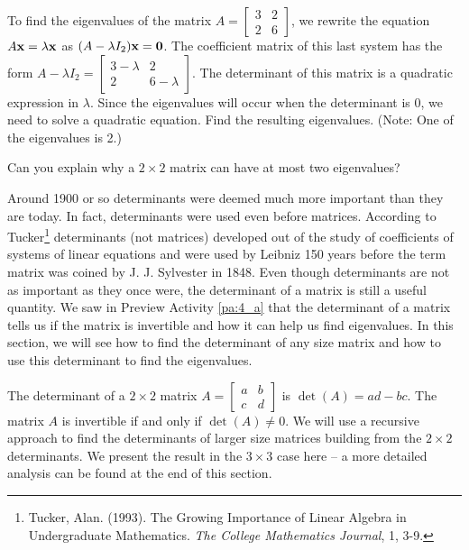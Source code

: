\begin{pa}
\item To find the eigenvalues of the matrix $A=\left[ \begin{array}{cc} 3&2\\2&6 \end{array} \right]$, we rewrite the equation $A \mathbf{x} = \lambda \mathbf{x}$ as $(A - \lambda I_2) \mathbf{x} = \mathbf{0}$. The coefficient matrix of this last system has the form $A-\lambda I_2 = \left[ \begin{array}{cc} 3-\lambda &2 \\ 2& 6-\lambda \end{array} \right]$. The determinant of this matrix is a quadratic expression in $\lambda$. Since the eigenvalues will occur when the determinant is 0, we need to solve a quadratic equation. Find the resulting eigenvalues. (Note: One of the eigenvalues is 2.)



\item Can you explain why a $2\times 2$ matrix can have at most two eigenvalues?
	

\ee

\end{pa}




Around 1900 or so determinants were deemed much more important than they are today. In fact, determinants were used even before matrices. According to Tucker\footnote{Tucker, Alan. (1993). The Growing Importance of Linear Algebra in Undergraduate Mathematics. \emph{The College Mathematics Journal}, 1, 3-9.} determinants (not matrices) developed out of the study of coefficients of systems of linear equations and were used by Leibniz 150 years before the term matrix was coined by J. J. Sylvester in 1848. Even though determinants are not as important as they once were, the determinant of a matrix is still a useful quantity. We saw in Preview Activity \ref{pa:4_a} that the determinant of a matrix tells us if the matrix is invertible and how it can help us find eigenvalues. In this section, we will see how to find the determinant of any size matrix and how to use this determinant to find the eigenvalues.

The determinant of a $2 \times 2$ matrix $A = \left[ \begin{array}{cc} a&b \\ c&d \end{array} \right]$ is $\det(A)=ad-bc$. The matrix $A$ is invertible if and only if $\det(A) \neq 0$. We will use a recursive approach to find the determinants of larger size matrices building from the $2\times 2$ determinants. We present the result in the $3 \times 3$ case here -- a more detailed analysis can be found at the end of this section. 

